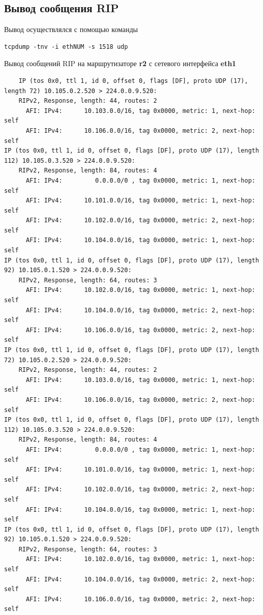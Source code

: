 \documentclass[a4paper,12pt]{article}
\begin{document}
\subsection{Вывод сообщения RIP}

Вывод осуществлялся с помощью команды
\begin{Verbatim}
tcpdump -tnv -i ethNUM -s 1518 udp
\end{Verbatim}

Вывод сообщений RIP на маршрутизаторе \textbf{r2} с сетевого интерфейса \textbf{eth1}
\begin{verbatim}
    IP (tos 0x0, ttl 1, id 0, offset 0, flags [DF], proto UDP (17), length 72) 10.105.0.2.520 > 224.0.0.9.520:  
	RIPv2, Response, length: 44, routes: 2
	  AFI: IPv4:      10.103.0.0/16, tag 0x0000, metric: 1, next-hop: self
	  AFI: IPv4:      10.106.0.0/16, tag 0x0000, metric: 2, next-hop: self
IP (tos 0x0, ttl 1, id 0, offset 0, flags [DF], proto UDP (17), length 112) 10.105.0.3.520 > 224.0.0.9.520: 
	RIPv2, Response, length: 84, routes: 4
	  AFI: IPv4:         0.0.0.0/0 , tag 0x0000, metric: 1, next-hop: self
	  AFI: IPv4:      10.101.0.0/16, tag 0x0000, metric: 1, next-hop: self
	  AFI: IPv4:      10.102.0.0/16, tag 0x0000, metric: 2, next-hop: self
	  AFI: IPv4:      10.104.0.0/16, tag 0x0000, metric: 1, next-hop: self
IP (tos 0x0, ttl 1, id 0, offset 0, flags [DF], proto UDP (17), length 92) 10.105.0.1.520 > 224.0.0.9.520: 
	RIPv2, Response, length: 64, routes: 3
	  AFI: IPv4:      10.102.0.0/16, tag 0x0000, metric: 1, next-hop: self
	  AFI: IPv4:      10.104.0.0/16, tag 0x0000, metric: 2, next-hop: self
	  AFI: IPv4:      10.106.0.0/16, tag 0x0000, metric: 2, next-hop: self
IP (tos 0x0, ttl 1, id 0, offset 0, flags [DF], proto UDP (17), length 72) 10.105.0.2.520 > 224.0.0.9.520: 
	RIPv2, Response, length: 44, routes: 2
	  AFI: IPv4:      10.103.0.0/16, tag 0x0000, metric: 1, next-hop: self
	  AFI: IPv4:      10.106.0.0/16, tag 0x0000, metric: 2, next-hop: self
IP (tos 0x0, ttl 1, id 0, offset 0, flags [DF], proto UDP (17), length 112) 10.105.0.3.520 > 224.0.0.9.520: 
	RIPv2, Response, length: 84, routes: 4
	  AFI: IPv4:         0.0.0.0/0 , tag 0x0000, metric: 1, next-hop: self
	  AFI: IPv4:      10.101.0.0/16, tag 0x0000, metric: 1, next-hop: self
	  AFI: IPv4:      10.102.0.0/16, tag 0x0000, metric: 2, next-hop: self
	  AFI: IPv4:      10.104.0.0/16, tag 0x0000, metric: 1, next-hop: self
IP (tos 0x0, ttl 1, id 0, offset 0, flags [DF], proto UDP (17), length 92) 10.105.0.1.520 > 224.0.0.9.520: 
	RIPv2, Response, length: 64, routes: 3
	  AFI: IPv4:      10.102.0.0/16, tag 0x0000, metric: 1, next-hop: self
	  AFI: IPv4:      10.104.0.0/16, tag 0x0000, metric: 2, next-hop: self
	  AFI: IPv4:      10.106.0.0/16, tag 0x0000, metric: 2, next-hop: self
\end{verbatim}
\end{document}
